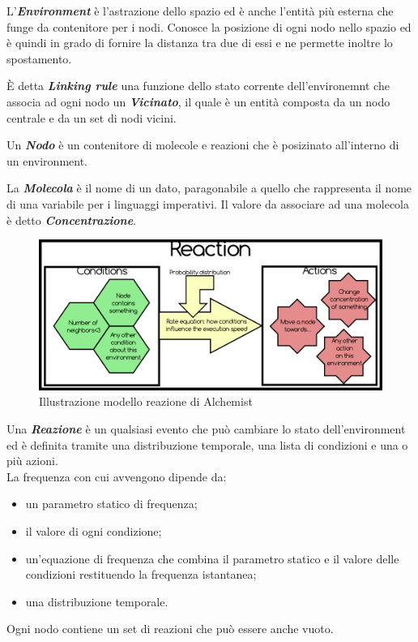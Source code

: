 \documentclass[12pt,a4paper,openright,twoside]{report}
\begin{document}
L'\textbf{\textit{Environment}} \`e l'astrazione dello spazio ed \`e anche l'entit\`a pi\`u esterna che funge da contenitore per i nodi. Conosce la posizione di ogni nodo nello spazio ed \`e quindi in grado di fornire la distanza tra due di essi e ne permette inoltre lo spostamento.

\`E detta \textbf{\textit{Linking rule}} una funzione dello stato corrente dell'environemnt che associa ad ogni nodo un \textbf{\textit{Vicinato}}, il quale \`e un entit\`a composta da un nodo centrale e da un set di nodi vicini.

Un \textbf{\textit{Nodo}} \`e un contenitore di molecole e reazioni che \`e posizinato all'interno di un environment.

La \textbf{\textit{Molecola}} \`e il nome di un dato, paragonabile a quello che rappresenta il nome di una variabile per i linguaggi imperativi.
Il valore da associare ad una molecola \`e detto \textbf{\textit{Concentrazione}}.

\begin{figure}[h] %
\begin{center} %
\includegraphics[width=14cm]{images/reaction.png} %
\caption[Illustrazione modello reazione di Alchemist]{Illustrazione modello reazione di Alchemist} \label{fig:alchemistReaction}
\end{center}
\end{figure}

Una \textbf{\textit{Reazione}} \`e un qualsiasi evento che pu\`o cambiare lo stato dell'environment ed \`e definita tramite una distribuzione temporale, una lista di condizioni e una o pi\`u azioni.
\\La frequenza con cui avvengono dipende da:
\begin{itemize}
\item un parametro statico di frequenza;
\item il valore di ogni condizione;
\item un'equazione di frequenza che combina il parametro statico e il valore delle condizioni restituendo la frequenza istantanea;
\item una distribuzione temporale.
\end{itemize}
Ogni nodo contiene un set di reazioni che pu\`o essere anche vuoto.
\end{document}
